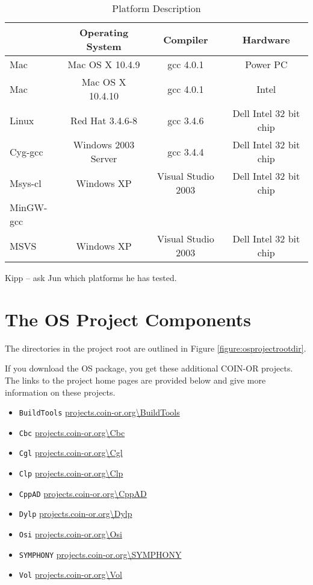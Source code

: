 \documentclass[11pt]{article}
\newcounter{Fig}
\renewcommand{\_}{{\char"5F}}
\renewcommand{\{}{{\char"7B}}
\renewcommand{\}}{{\char"7D}}
\renewcommand{\^}{{\char"0D}}
\renewcommand{\'}{{\char"0D}}
\begin{document}
 \begin{table}
\caption{Platform Description}
\centering
\label{table:platformdescription}
\vskip 8pt
 \begin{tabular}{l|c|c|c|}
 & {\bf Operating System} & {\bf Compiler} & {\bf  Hardware} \\ \hline
 Mac &Mac OS X 10.4.9&gcc 4.0.1&Power PC \\   \hline
  Mac &Mac OS X 10.4.10&gcc 4.0.1&Intel \\   \hline
 Linux &Red Hat 3.4.6-8&gcc 3.4.6& Dell Intel 32 bit chip\\ \hline
 Cyg-gcc &Windows 2003 Server&gcc 3.4.4& Dell Intel 32 bit chip \\ \hline
 Msys-cl &Windows XP&Visual Studio 2003 &Dell Intel 32 bit chip \\ \hline
 MinGW-gcc &&& \\ \hline
 MSVS &Windows XP&Visual Studio 2003 &Dell Intel 32 bit chip \\ \hline
\end{tabular}
\end{table}

Kipp -- ask Jun which platforms he has tested.
 
 


\section{The OS Project Components}\label{section:projectcomponents}

The directories in the  project root  are outlined in Figure  \ref{figure:osprojectrootdir}.

If you download the OS package, you get these additional COIN-OR projects. The links to the project home pages are provided below and give more information on these projects. 
\begin{itemize}
\item {\tt BuildTools} \url{projects.coin-or.org\BuildTools}
\item {\tt Cbc} \url{projects.coin-or.org\Cbc}
\item {\tt Cgl} \url{projects.coin-or.org\Cgl}
\item {\tt Clp}  \url{projects.coin-or.org\Clp}
\item {\tt CppAD} \url{projects.coin-or.org\CppAD}
\item {\tt Dylp} \url{projects.coin-or.org\Dylp}
\item {\tt Osi} \url{projects.coin-or.org\Osi}
\item {\tt SYMPHONY}   \url{projects.coin-or.org\SYMPHONY}
\item {\tt Vol}   \url{projects.coin-or.org\Vol}
\end{itemize}
\end{document}
